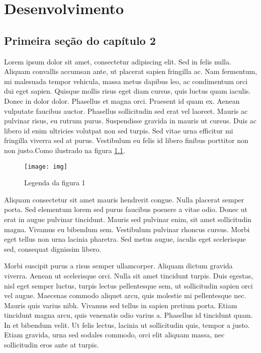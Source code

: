 \chapter{Desenvolvimento}

\section{Primeira seção do capítulo 2}

Lorem ipsum dolor sit amet, consectetur adipiscing elit. Sed in felis nulla. Aliquam convallis accumsan ante, ut placerat sapien fringilla ac. Nam fermentum, mi malesuada tempor vehicula, massa metus dapibus leo, ac condimentum orci dui eget sapien. Quisque mollis risus eget diam cursus, quis luctus quam iaculis. Donec in dolor dolor. Phasellus et magna orci. Praesent id quam ex. Aenean vulputate faucibus auctor. Phasellus sollicitudin sed erat vel laoreet. Mauris ac pulvinar risus, eu rutrum purus. Suspendisse gravida in mauris ut cursus. Duis ac libero id enim ultricies volutpat non sed turpis. Sed vitae urna efficitur mi fringilla viverra sed at purus. Vestibulum eu felis id libero finibus porttitor non non justo.Como ilustrado na figura \ref{figura1}.

\begin{figure}
\label{figura1}
\centering
\texttt{[image: img]}
\caption{Legenda da figura 1}
\end{figure}


Aliquam consectetur sit amet mauris hendrerit congue. Nulla placerat semper porta. Sed elementum lorem sed purus faucibus posuere a vitae odio. Donec ut erat in augue pulvinar tincidunt. Mauris sed pulvinar enim, sit amet sollicitudin magna. Vivamus eu bibendum sem. Vestibulum pulvinar rhoncus cursus. Morbi eget tellus non urna lacinia pharetra. Sed metus augue, iaculis eget scelerisque sed, consequat dignissim libero.

Morbi suscipit purus a risus semper ullamcorper. Aliquam dictum gravida viverra. Aenean ut scelerisque orci. Nulla sit amet tincidunt turpis. Duis egestas, nisl eget semper luctus, turpis lectus pellentesque sem, ut sollicitudin sapien orci vel augue. Maecenas commodo aliquet arcu, quis molestie mi pellentesque nec. Mauris quis varius nibh. Vivamus sed tellus in sapien pretium porta. Etiam tincidunt magna arcu, quis venenatis odio varius a. Phasellus id tincidunt quam. In et bibendum velit. Ut felis lectus, lacinia ut sollicitudin quis, tempor a justo. Etiam gravida, urna sed sodales commodo, orci elit aliquam massa, nec sollicitudin eros ante at turpis.

